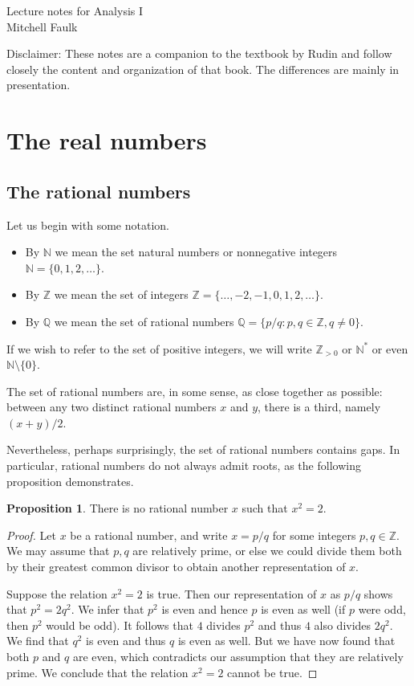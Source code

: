 \documentclass[12pt]{article}
\theoremstyle{definition}
\theoremstyle{theorem}
\newtheorem{proposition}[definition]{Proposition}
\begin{document}
\noindent Lecture notes for Analysis I \\ Mitchell Faulk

\medskip


\noindent Disclaimer: These notes are a companion to the textbook by Rudin and follow closely the content and organization of that book. The differences are mainly in presentation. 

\tableofcontents

\section{The real numbers}

\subsection{The rational numbers}
Let us begin with some notation. 
\begin{itemize}
\item By $\mathbb{N}$ we mean the set natural numbers or nonnegative integers $\mathbb{N} = \{0, 1, 2, \ldots\}$. 
\item By $\mathbb{Z}$ we mean the set of integers $\mathbb{Z} = \{\ldots, -2, -1, 0, 1, 2, \ldots \}$. 
\item By $\mathbb{Q}$ we mean the set of rational numbers $\mathbb{Q} = \{p/q : p, q \in \mathbb{Z}, q \ne 0\}$. 
\end{itemize}
If we wish to refer to the set of positive integers, we will write $\mathbb{Z}_{>0}$ or $\mathbb{N}^*$ or even $\mathbb{N} \setminus \{0\}$. 

The set of rational numbers are, in some sense, as close together as possible: between any two distinct rational numbers $x$ and $y$, there is a third, namely $(x+y)/2$. 

Nevertheless, perhaps surprisingly, the set of rational numbers contains gaps. In particular, rational numbers do not always admit roots, as the following proposition demonstrates.  

\begin{proposition}
There is no rational number $x$ such that $x^2 = 2$. 
\end{proposition}

\begin{proof}
Let $x$ be a rational number, and write $x = p/q$ for some integers $p,q \in \mathbb{Z}$. We may assume that $p,q$ are relatively prime, or else we could divide them both by their greatest common divisor to obtain another representation of $x$. 

Suppose the relation $x^2 = 2$ is true.  Then our representation of $x$ as $p/q$ shows that $p^2 = 2q^2$. We infer that $p^2$ is even and hence $p$ is even as well (if $p$ were odd, then $p^2$ would be odd). It follows that $4$ divides $p^2$ and thus $4$ also divides $2q^2$. We find that $q^2$ is even and thus $q$ is even as well. But we have now found that both $p$ and $q$ are even, which contradicts our assumption that they are relatively prime. We conclude that the relation $x^2 = 2$ cannot be true. 
\end{proof}
\end{document}
